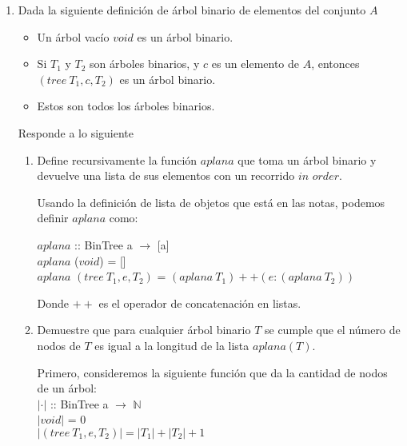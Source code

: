 \documentclass{article}
\begin{document}
\begin{enumerate}
{\begin{enumerate}
            \end{enumerate}
        }
        \item {
            Dada la siguiente definición de árbol binario de elementos del 
            conjunto $A$
            \begin{itemize}
                \item {
                    Un árbol vacío $void$ es un árbol binario.
                }
                \item {
                    Si $T_1$ y $T_2$ son árboles binarios, y $c$ es un elemento 
                    de $A$, entonces $(tree \ T_1, c, T_2)$ es un árbol binario.
                }
                \item {
                    Estos son todos los árboles binarios.
                }
            \end{itemize}
            Responde a lo siguiente
            \begin{enumerate}
                \item {
                    Define recursivamente la función $aplana$ que toma
                    un árbol binario y devuelve una lista de sus elementos con 
                    un recorrido $\textit{in order}$.
		            
                    Usando la definición de lista de objetos que está en las notas, 
                    podemos definir $aplana$ como:
                    
                    $aplana$ :: BinTree a $\rightarrow$ [a]\\
					$aplana$ ($void$) = []\\
                    $aplana$ $(tree \ T_1, e, T_2)$ = 
                    $(aplana \ T_1) ++ (e:(aplana \ T_2))$

                    Donde $++$ es el operador de concatenación en listas.
                }
                \item {
                    Demuestre que para cualquier árbol binario $T$ se cumple que
                    el número de nodos de $T$ es igual a la longitud de la lista 
                    $aplana(T)$.
                    
                    Primero, consideremos la siguiente función que da la cantidad
                    de nodos de un árbol:\\ 
                    $|\cdot|$ :: BinTree a $\rightarrow$ $\mathbb{N}$\\
					$|void|$ = 0\\
					$|(tree \ T_1, e, T_2)| = |T_1| + |T_2| + 1$
                    
}
\end{enumerate}}
\end{enumerate}
\end{document}
